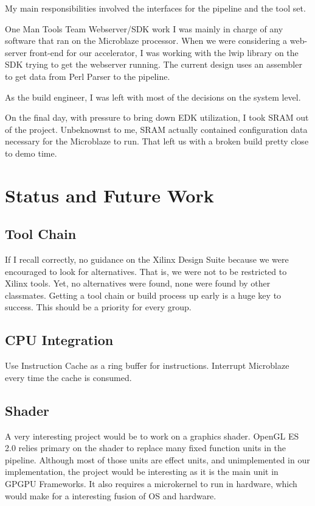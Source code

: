 \documentclass[letterpaper,10pt]{article}
\begin{document}
My main responsibilities involved the interfaces for the pipeline and the tool set.


One Man Tools Team
Webserver/SDK work
I was mainly in charge of any software that ran on the Microblaze processor.  When we were considering a web-server front-end for our accelerator, I was working with the lwip library on the SDK trying to get the webserver running.  The current design uses an assembler to get data from Perl Parser to the pipeline.

As the build engineer, I was left with most of the decisions on the system level.   

On the final day, with pressure to bring down EDK utilization, I took SRAM out of the project.  Unbeknownst to me, SRAM actually contained configuration data necessary for the Microblaze to run.  That left us with a broken build pretty close to demo time. 

\section{Status and Future Work}

\subsection{Tool Chain}
If I recall correctly, no guidance on the Xilinx Design Suite because we were encouraged to look for alternatives.  That is, we were not to be restricted to Xilinx tools.  Yet, no alternatives were found, none were found by other classmates.  Getting a tool chain or build process up early is a huge key to success.  This should be a priority for every group. 	

\subsection{CPU Integration}
Use Instruction Cache as a ring buffer for instructions.  Interrupt Microblaze every time the cache is consumed.

\subsection{Shader}
A very interesting project would be to work on a graphics shader.  OpenGL ES 2.0 relies primary on the shader to replace many fixed function units in the pipeline.  Although most of those units are effect units, and unimplemented in our implementation, the project would be interesting as it is the main unit in GPGPU Frameworks.  It also requires a microkernel to run in hardware, which would make for a interesting fusion of OS and hardware.
\end{document}
